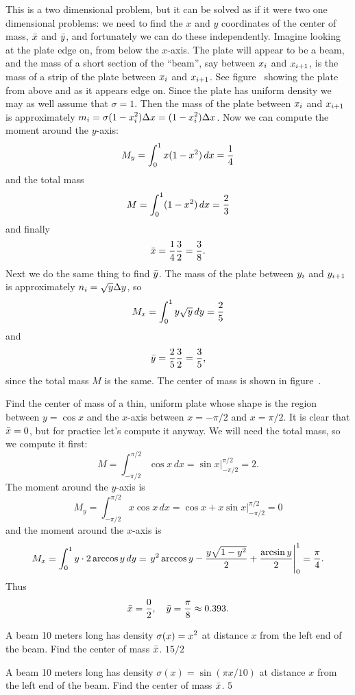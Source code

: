 This is a two dimensional problem, but it can be solved as if it were
two one dimensional problems: we need to find the $x$ and $y$
coordinates of the center of mass, $\displaystyle \bar x$ and $\displaystyle \bar y$, and
fortunately we can do these independently. Imagine looking at the
plate edge on, from below the $x$-axis. The plate will appear to be a
beam, and the mass of a short section of the ``beam'', say between
$\displaystyle x_i$ and $\displaystyle x_{i+1}$, is the mass of a strip of the plate
between $\displaystyle x_i$ and $\displaystyle x_{i+1}$. See figure~ showing the plate from above and as it appears edge
on. Since the plate has uniform density we may as well assume that
$\sigma=1$. Then the mass of the plate between $\displaystyle x_i$ and $\displaystyle
x_{i+1}$ is approximately $\displaystyle m_i=\sigma(1-x_i^2)\Delta
x=(1-x_i^2)\Delta x$.  Now we can compute the moment around the
$y$-axis:
$$M_y=\int_0^1 x(1-x^2)\,dx={1\over4}$$
and the total mass 
$$M=\int_0^1 (1-x^2)\,dx={2\over3}$$
and finally
$$\bar x = {1\over4}{3\over2}={3\over8}.$$
Next we do the same thing to find $\displaystyle \bar y$. The mass of the plate
between $\displaystyle y_i$ and $\displaystyle y_{i+1}$ is approximately $\displaystyle
n_i=\sqrt{y}\Delta y$, so
$$M_x=\int_0^1 y\sqrt{y}\,dy={2\over5}$$
and
$$\bar y={2\over5}{3\over2}={3\over5},$$
since the total mass $M$ is the same. The center of mass is shown in
figure~.  
\endexample

\example \relax{}
Find the center of mass of a thin, uniform plate whose shape
is the region between $y=\cos x$ and the $x$-axis between $x=-\pi/2$
and $x=\pi/2$. It is clear that $\displaystyle \bar x=0$, but for practice let's
compute it anyway. We will need the total mass, so we compute it
first:
$$
  M=\int_{-\pi/2}^{\pi/2} \cos x\,dx=\sin x\Big|_{-\pi/2}^{\pi/2}=2.
$$
The moment around the $y$-axis is
$$
  M_y=\int_{-\pi/2}^{\pi/2} x\cos x\,dx=
  \cos x+x\sin x\Big|_{-\pi/2}^{\pi/2}=0
$$
and the moment around the $x$-axis is
$$
  M_x=\int_{0}^{1} y\cdot2\arccos y\,dy=
  \left.y^2\arccos y-{y\sqrt{1-y^2}\over2}+{\arcsin y\over 2}
  \right|_{0}^{1}={\pi\over4}.
$$
Thus
$$\bar x={0\over2},\quad \bar y={\pi\over8}\approx 0.393.$$
\vskip-10pt\endexample

\exercises

\exercise A beam 10 meters long has density $\displaystyle \sigma(x)=x^2$ at
distance $x$ from the left end of the beam. Find the center of mass
$\displaystyle \bar x$.
\answer $15/2$
\endanswer
\endexercise

\exercise A beam 10 meters long has density $\sigma(x)=\sin(\pi x/10)$ at
distance $x$ from the left end of the beam. Find the center of mass
$\displaystyle \bar x$.
\answer $5$
\endanswer
\endexercise

